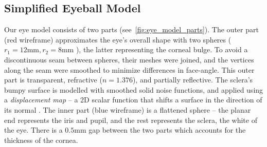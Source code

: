 \subsection{Simplified Eyeball Model}
\label{subsec:eyeball_model}




Our eye model consists of two parts (see~\autoref{fig:eye_model_parts}).
The outer part (red wireframe) approximates the eye's overall shape with two spheres ($r_1\!=\!12\textrm{mm}, r_2\!=\!8\textrm{mm}$ \cite{ruhland2014look}), the latter representing the corneal bulge.
To avoid a discontinuous seam between spheres, their meshes were joined, and the vertices along the seam were smoothed to minimize differences in face-angle.
This outer part is transparent, refractive ($n\!=\!1.376$), and partially reflective.
The sclera's bumpy surface is modelled with smoothed solid noise functions, and applied using a \emph{displacement map} -- a 2D scalar function that shifts a surface in the direction of its normal \cite{lee2000displaced}.
The inner part (blue wireframe) is a flattened sphere  -- the planar end represents the iris and pupil, and the rest represents the sclera, the white of the eye.
There is a $0.5\textrm{mm}$ gap between the two parts which accounts for the thickness of the cornea.

